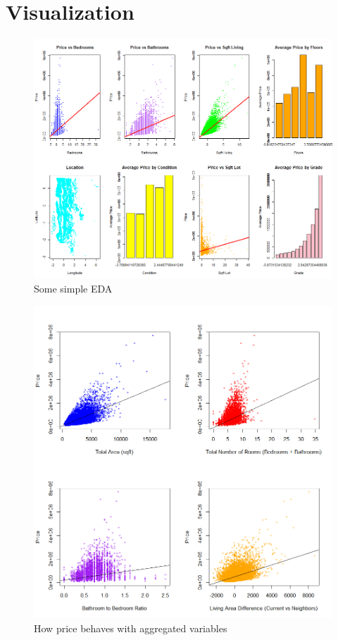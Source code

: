 \documentclass[a4paper, 11pt]{article}
\begin{document}
\pagebreak
\appendix

\section{Visualization}
 \vspace{7pt}

\begin{figure}[H]
\includegraphics[scale=0.7]{eda}
\centering
\caption{Some simple EDA}
\label{fig:eda}
\end{figure}

\begin{figure}[h]
\includegraphics[scale=0.5]{corrplots}
\centering
\caption{How price behaves with aggregated variables}
\label{fig:corrplots}
\end{figure}
\end{document}
